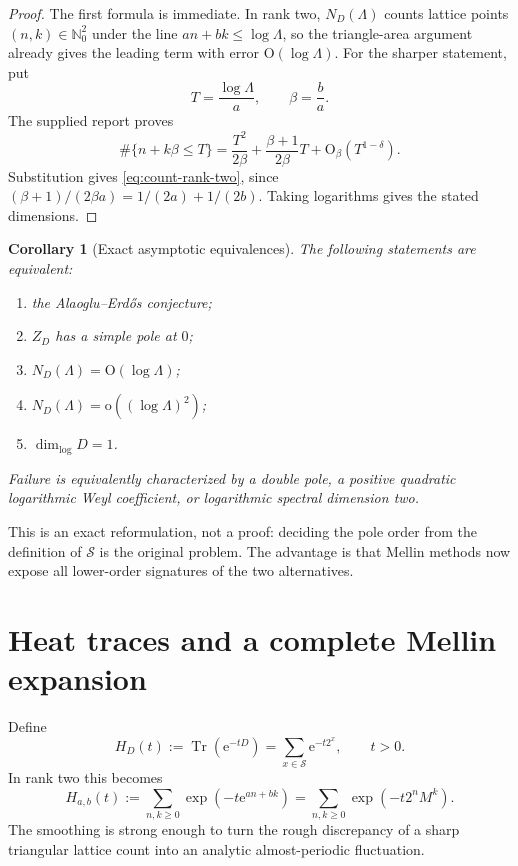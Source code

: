 \documentclass[11pt,oneside]{article}
\newtheorem{corollary}[theorem]{Corollary}
\theoremstyle{definition}
\theoremstyle{remark}
\newcommand{\Nzero}{\mathbb N_0}
\newcommand{\Sol}{\mathcal S}
\newcommand{\Tr}{\operatorname{Tr}}
\newcommand{\e}{\mathrm e}
\newcommand{\bigO}{\mathrm O}
\newcommand{\littleo}{\mathrm o}
\begin{document}
\begin{proof}
The first formula is immediate.  In rank two, $N_D(\Lambda)$ counts lattice points $(n,k)\in\Nzero^2$ under the line $an+bk\le\log\Lambda$, so the triangle-area argument already gives the leading term with error $\bigO(\log\Lambda)$.  For the sharper statement, put
\[
 T=\frac{\log\Lambda}{a},\qquad \beta=\frac ba.
\]
The supplied report proves
\[
 \#\{n+k\beta\le T\}
 =\frac{T^2}{2\beta}+\frac{\beta+1}{2\beta}T
  +\bigO_\beta(T^{1-\delta}).
\]
Substitution gives \eqref{eq:count-rank-two}, since
$(\beta+1)/(2\beta a)=1/(2a)+1/(2b)$.  Taking logarithms gives the stated dimensions.
\end{proof}

\begin{corollary}[Exact asymptotic equivalences]
\label{cor:asymptotic-equivalences}
The following statements are equivalent:
\begin{enumerate}[label=\textup{(\alph*)}]
  \item the Alaoglu--Erd\H{o}s conjecture;
  \item $Z_D$ has a simple pole at $0$;
  \item $N_D(\Lambda)=\bigO(\log\Lambda)$;
  \item $N_D(\Lambda)=\littleo((\log\Lambda)^2)$;
  \item $\dim_{\log}D=1$.
\end{enumerate}
Failure is equivalently characterized by a double pole, a positive quadratic logarithmic Weyl coefficient, or logarithmic spectral dimension two.
\end{corollary}

This is an exact reformulation, not a proof: deciding the pole order from the definition of $\Sol$ is the original problem.  The advantage is that Mellin methods now expose all lower-order signatures of the two alternatives.

\section{Heat traces and a complete Mellin expansion}
\label{sec:heat}

Define
\[
  H_D(t):=\Tr(\e^{-tD})=\sum_{x\in\Sol}\e^{-t2^x},
  \qquad t>0.
\]
In rank two this becomes
\begin{equation}
  H_{a,b}(t):=\sum_{n,k\ge0}\exp\!\left(-t\e^{an+bk}\right)
             =\sum_{n,k\ge0}\exp(-t2^nM^k).
  \label{eq:rank-two-heat}
\end{equation}
The smoothing is strong enough to turn the rough discrepancy of a sharp triangular lattice count into an analytic almost-periodic fluctuation.
\end{document}
